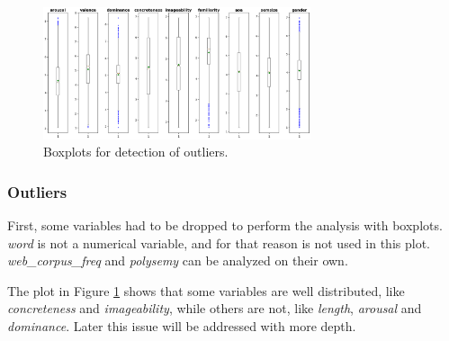 \documentclass[a4paper,11pt,dvipsnames]{article}
\begin{document}


\begin{figure}[h]
    \centering
    \includegraphics[width=0.7\textwidth]{Graphs/outliers.png}
    \caption{Boxplots for detection of outliers.}
    \label{fig:outliers}
\end{figure}
\subsubsection{Outliers}


First, some variables had to be dropped to perform the analysis with boxplots. \textit{word} is not a numerical variable, and for that reason is not used in this plot. \textit{web\_corpus\_freq} and \textit{polysemy} can be analyzed on their own.


The plot in Figure \ref{fig:outliers} shows that some variables are well distributed, like \textit{concreteness} and \textit{imageability}, while others are not, like \textit{length}, \textit{arousal} and \textit{dominance}. Later this issue will be addressed with more depth.
\end{document}
